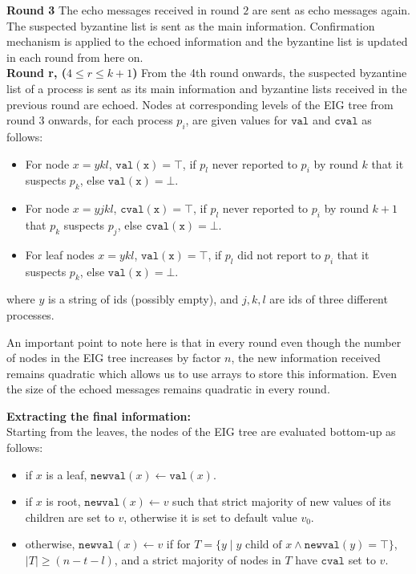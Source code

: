     \textbf{Round 3} The echo messages received in round $2$ are sent as echo messages again. The suspected byzantine list is sent as the main information. Confirmation mechanism is applied to the echoed information and the byzantine list is updated in each round from here on. \\
    \textbf{Round r, ($4 \leq r \leq k+1$)} From the 4th round onwards, the suspected byzantine list of a process is sent as its main information and byzantine lists received in the previous round are echoed. Nodes at corresponding levels of the EIG tree from round 3 onwards, for each process $p_i$, are given values for $\mathtt{val}$ and $\mathtt{cval}$ as follows:
    \begin{itemize}
        \item For node $x=ykl$, $\mathtt{val(x)} = \top$, if $p_l$ never reported to $p_i$ by round $k$ that it suspects $p_k$, else $\mathtt{val(x)} = \bot$.
        \item For node $x=yjkl$, $\mathtt{cval(x)} = \top$, if $p_l$ never reported to $p_i$ by round $k+1$ that $p_k$ suspects $p_j$, else $\mathtt{cval(x)} = \bot$.
        \item For leaf nodes $x = ykl$, $\mathtt{val(x)} = \top$, if $p_l$ did not report to $p_i$ that it suspects $p_k$, else $\mathtt{val(x)} = \bot$.
    \end{itemize}
where $y$ is a string of ids (possibly empty), and $j, k, l$ are ids of three different processes.

 An important point to note here is that in every round even though the number of nodes in the EIG tree increases by factor $n$, the new information received remains quadratic which allows us to use arrays to store this information. Even the size of the echoed messages remains quadratic in every round. 

 \textbf{Extracting the final information:}\\
Starting from the leaves, the nodes of the EIG tree are evaluated bottom-up as follows:
\begin{itemize}
    \item if $x$ is a leaf, $\mathtt{newval}(x) \leftarrow \mathtt{val}(x)$.
    \item if $x$ is root, $\mathtt{newval}(x) \leftarrow v$ such that strict majority of new values of its children are set to $v$, otherwise it is set to default value $v_0$.
    \item otherwise, $\mathtt{newval}(x) \leftarrow v$ if for $T = \{y \mid y \text{ child of } x \wedge \mathtt{newval}(y) = \top\}$, $\mid T \mid \geq (n-t-l)$, and a strict majority of nodes in $T$ have $\mathtt{cval}$ set to $v$.
\end{itemize}


